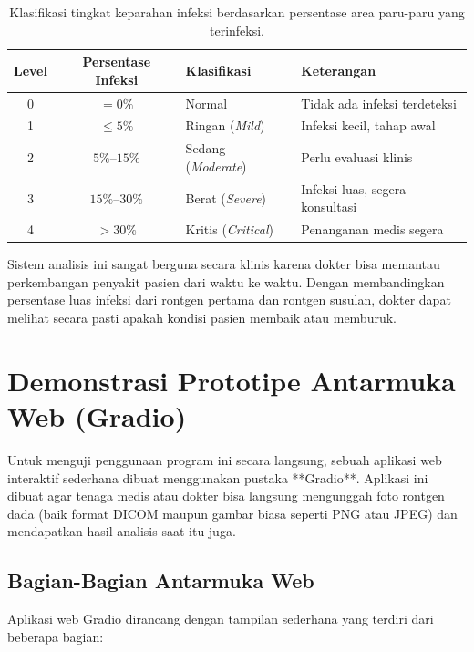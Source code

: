 \documentclass[12pt,a4paper,oneside]{book}
\begin{document}
\begin{table}[htbp]
  \centering
  \caption{Klasifikasi tingkat keparahan infeksi berdasarkan persentase area paru-paru yang terinfeksi.}
  \label{tab:severity_grading}
  \begin{tabularx}{\textwidth}{cclX}
    \toprule
    \textbf{Level} & \textbf{Persentase Infeksi} & \textbf{Klasifikasi} & \textbf{Keterangan} \\
    \midrule
    0 & $= 0\%$          & Normal             & Tidak ada infeksi terdeteksi \\
    1 & $\le 5\%$          & Ringan (\textit{Mild})    & Infeksi kecil, tahap awal \\
    2 & $5\%$--$15\%$    & Sedang (\textit{Moderate}) & Perlu evaluasi klinis \\
    3 & $15\%$--$30\%$   & Berat (\textit{Severe})   & Infeksi luas, segera konsultasi \\
    4 & $> 30\%$         & Kritis (\textit{Critical}) & Penanganan medis segera \\
    \bottomrule
  \end{tabularx}
\end{table}

Sistem analisis ini sangat berguna secara klinis karena dokter bisa memantau perkembangan penyakit pasien dari waktu ke waktu. Dengan membandingkan persentase luas infeksi dari rontgen pertama dan rontgen susulan, dokter dapat melihat secara pasti apakah kondisi pasien membaik atau memburuk.

\section{Demonstrasi Prototipe Antarmuka Web (Gradio)}

Untuk menguji penggunaan program ini secara langsung, sebuah aplikasi web interaktif sederhana dibuat menggunakan pustaka **Gradio**. Aplikasi ini dibuat agar tenaga medis atau dokter bisa langsung mengunggah foto rontgen dada (baik format DICOM maupun gambar biasa seperti PNG atau JPEG) dan mendapatkan hasil analisis saat itu juga.

\subsection{Bagian-Bagian Antarmuka Web}

Aplikasi web Gradio dirancang dengan tampilan sederhana yang terdiri dari beberapa bagian:
\end{document}
